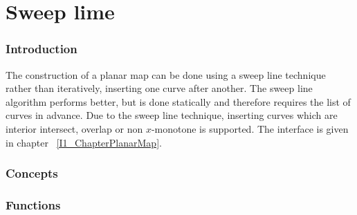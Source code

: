\chapter{Sweep lime}

\subsection*{Introduction}
The construction of a planar map can be done using a sweep line
technique rather than iteratively, inserting one curve after another.
The sweep line algorithm performs better, but is done statically and
therefore requires the list of curves in advance.  Due to the sweep
line technique, inserting curves which are interior intersect,
overlap or non $x$-monotone is supported. The interface is given in
chapter ~\ref{I1_ChapterPlanarMap}.

\begin{ccTexOnly}

\subsection*{Concepts}

\subsection*{Functions}
\\
\\
\\

\end{ccTexOnly}    
